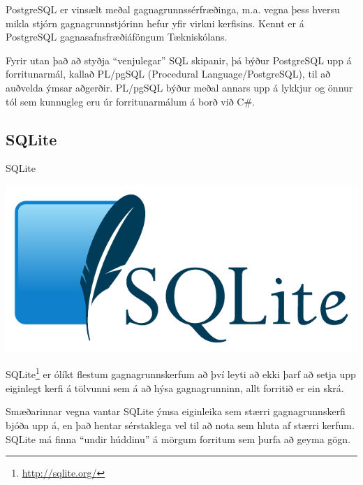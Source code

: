 PostgreSQL er vinsælt meðal gagnagrunnssérfræðinga, m.a. vegna þess hversu mikla stjórn gagnagrunnstjórinn hefur yfir virkni kerfisins. Kennt er á PostgreSQL gagnasafnsfræðiáföngum Tækniskólans.

Fyrir utan það að styðja ``venjulegar'' SQL skipanir, þá býður PostgreSQL upp á forritunarmál, kallað PL/pgSQL (Procedural Language/PostgreSQL), til að auðvelda ýmsar aðgerðir. PL/pgSQL býður meðal annars upp á lykkjur og önnur tól sem kunnugleg eru úr forritunarmálum á borð við C\#.
\subsection{SQLite}
\begin{marginfigure}
\caption{SQLite}
\label{mynd:sqlite}
\centering
\includegraphics[width=\linewidth]{myndir/sqlite}
\end{marginfigure}
SQLite\footnote{\url{http://sqlite.org/}} er ólíkt flestum gagnagrunnskerfum að því leyti að ekki þarf að setja upp eiginlegt kerfi á tölvunni sem á að hýsa gagnagrunninn, allt forritið er ein skrá.

Smæðarinnar vegna vantar SQLite ýmsa eiginleika sem stærri gagnagrunnskerfi bjóða upp á, en það hentar sérstaklega vel til að nota sem hluta af stærri kerfum. SQLite má finna ``undir húddinu'' á mörgum forritum sem þurfa að geyma gögn.
